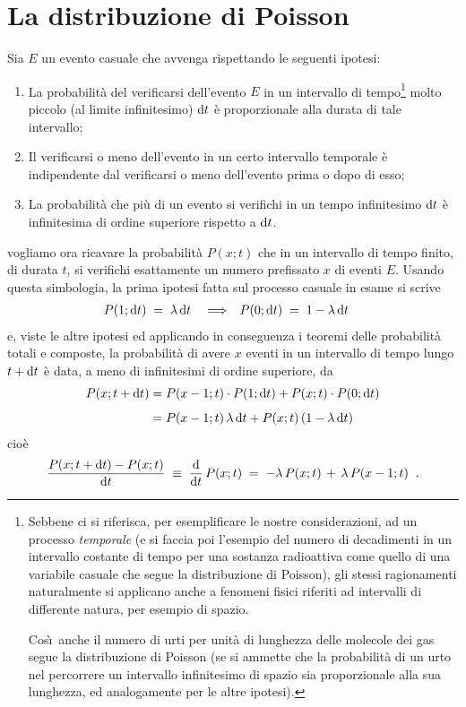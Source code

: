 \section{La distribuzione di Poisson}%
%
%
\label{ch:8.poisson}
Sia $E$ un evento casuale che avvenga rispettando le
seguenti ipotesi:
\begin{enumerate}
\item La probabilit\`a del verificarsi dell'evento $E$ in un
  intervallo di tempo\/\footnote{Sebbene ci si riferisca,
    per esemplificare le nostre considerazioni, ad un
    processo \emph{temporale} (e si faccia poi l'esempio del
    numero di decadimenti in un intervallo costante di tempo
    per una sostanza radioattiva come quello di una
    variabile casuale che segue la distribuzione di
    Poisson), gli stessi ragionamenti naturalmente si
    applicano anche a fenomeni fisici riferiti ad intervalli
    di differente natura, per esempio di spazio.

    Cos\`\i\ anche il numero di urti per unit\`a di
    lunghezza delle molecole dei gas segue la distribuzione
    di Poisson (se si ammette che la probabilit\`a di un
    urto nel percorrere un intervallo infinitesimo di spazio
    sia proporzionale alla sua lunghezza, ed analogamente
    per le altre ipotesi).} molto piccolo (al limite
  infinitesimo) $\mathrm{d} t$ \`e proporzionale alla durata di
  tale intervallo;
\item\label{it:pois2} Il verificarsi o meno dell'evento in
  un certo intervallo temporale \`e indipendente dal
  verificarsi o meno dell'evento prima o dopo di esso;
\item La probabilit\`a che pi\`u di un evento si
  verifichi in un tempo infinitesimo $\mathrm{d} t$ \`e
  infinitesima di ordine superiore rispetto a $\mathrm{d} t$.
\end{enumerate}
vogliamo ora ricavare la probabilit\`a $P(x;t)$ che in un
intervallo di tempo finito, di durata $t$, si verifichi
esattamente un numero prefissato $x$ di eventi $E$.  Usando
questa simbologia, la prima ipotesi fatta sul processo
casuale in esame si scrive
\begin{align*}
  P (1; \mathrm{d} t) \; &= \; \lambda \, \mathrm{d} t
  && \Longrightarrow &
  P (0; \mathrm{d} t) \; &= \; 1 - \lambda \, \mathrm{d} t
\end{align*}
e, viste le altre ipotesi ed applicando in conseguenza i
teoremi delle probabilit\`a totali e composte, la
probabilit\`a di avere $x$ eventi in un intervallo di tempo
lungo $t+\mathrm{d} t$ \`e data, a meno di infinitesimi di ordine
superiore, da
\begin{align*}
  P(x; t+\mathrm{d} t) &= P(x-1;t) \cdot
    P(1;\mathrm{d} t) + P(x;t) \cdot P(0; \mathrm{d} t)
    \\[1ex]
  &= P(x-1; t) \, \lambda \, \mathrm{d} t +
    P(x;t) \, (1 - \lambda \, \mathrm{d} t)
\end{align*}
cio\`e
\begin{equation*}
  \frac{P(x;t+\mathrm{d} t) - P(x;t)}{\mathrm{d} t} \; \equiv \;
    \frac{\mathrm{d}}{\mathrm{d} t} \, P(x;t) \; = \;
    - \lambda \, P(x;t) \, + \, \lambda \, P(x-1;t) \;\; .
\end{equation*}

